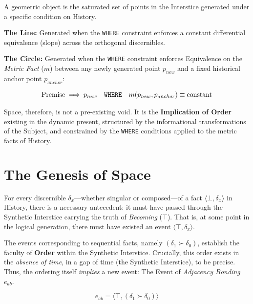 \begin{formalism}
    A geometric object is the saturated set of points in the Interstice generated
    under a specific condition on History. 
    
    \textbf{The Line:} Generated when the \texttt{WHERE} constraint enforces a
    constant differential equivalence (slope) across the orthogonal discernibles.
    
    \textbf{The Circle:} Generated when the \texttt{WHERE} constraint enforces
    Equivalence on the \textit{Metric Fact} ($m$) between any newly generated
    point $p_{new}$ and a fixed historical anchor point $p_{anchor}$:
    
    \begin{equation}
        \text{Premise} \implies p_{new} \quad \textnormal{\texttt{WHERE}} \quad m(p_{new}, p_{anchor}) \equiv \text{constant}
    \end{equation}
    
\end{formalism}

Space, therefore, is not a pre-existing void. It is the \textbf{Implication of
Order} existing in the dynamic present, structured by the informational
transformations of the Subject, and constrained by the \texttt{WHERE} conditions
applied to the metric facts of History.

\section{The Genesis of Space}

For every discernible $\delta_x$---whether singular or composed---of a fact
$\langle \bot, \delta_x \rangle$ in History, there is a necessary antecedent:
it must have passed through the Synthetic Interstice carrying the truth of
\textit{Becoming} ($\top$). That is, at some point in the logical generation,
there must have existed an event $\langle \top, \delta_x \rangle$.

The events corresponding to sequential facts, namely $(\delta_1 \succ
\delta_0)$, establish the faculty of \textbf{Order} within the Synthetic
Interstice. Crucially, this order exists in the \textit{absence of time}, in a
gap of time (the Synthetic Interstice), to be precise. Thus, the ordering
itself \textit{implies} a new event: The Event of {\it Adjacency Bonding\/}
$e_{ab}$.

\begin{equation}
    e_{ab} = \langle \top, (\delta_1 \succ \delta_0) \rangle 
\end{equation}

